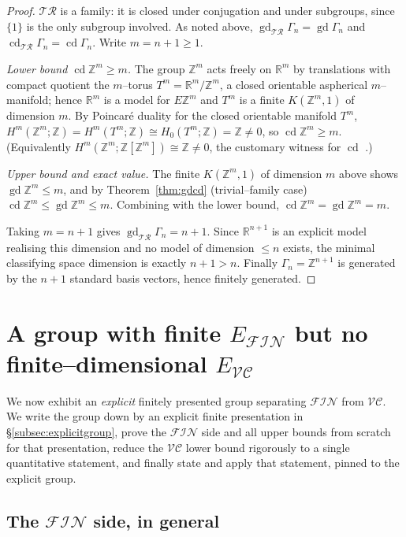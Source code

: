 \documentclass{amsart}
\theoremstyle{definition}
\newcommand{\Z}{\mathbb{Z}}
\newcommand{\R}{\mathbb{R}}
\newcommand{\FIN}{\mathcal{F\!I\!N}}
\newcommand{\VC}{\mathcal{V\!C}}
\newcommand{\gd}{\operatorname{gd}}
\newcommand{\cd}{\operatorname{cd}}
\begin{document}
\begin{proof}
$\mathcal{TR}$ is a family: it is closed under conjugation and under subgroups, since
$\{1\}$ is the only subgroup involved. As noted above,
$\gd_{\mathcal{TR}}\Gamma_n=\gd\Gamma_n$ and $\cd_{\mathcal{TR}}\Gamma_n=\cd\Gamma_n$. Write
$m=n+1\ge 1$.

\smallskip
\emph{Lower bound $\cd\Z^{m}\ge m$.} The group $\Z^{m}$ acts freely on $\R^{m}$ by
translations with compact quotient the $m$--torus $T^{m}=\R^{m}/\Z^{m}$, a closed orientable
aspherical $m$--manifold; hence $\R^{m}$ is a model for $E\Z^{m}$ and $T^{m}$ is a finite
$K(\Z^{m},1)$ of dimension $m$. By Poincaré duality for the closed orientable manifold
$T^{m}$, $H^{m}(\Z^{m};\Z)=H^{m}(T^{m};\Z)\cong H_{0}(T^{m};\Z)=\Z\ne 0$, so
$\cd\Z^{m}\ge m$. (Equivalently $H^{m}(\Z^{m};\Z[\Z^{m}])\cong\Z\ne0$, the customary
witness for $\cd$ \cite[\S VIII.2]{Brown}.)

\smallskip
\emph{Upper bound and exact value.} The finite $K(\Z^{m},1)$ of dimension $m$ above shows
$\gd\Z^{m}\le m$, and by Theorem~\ref{thm:gdcd} (trivial--family case)
$\cd\Z^{m}\le\gd\Z^{m}\le m$. Combining with the lower bound, $\cd\Z^{m}=\gd\Z^{m}=m$.

\smallskip
Taking $m=n+1$ gives $\gd_{\mathcal{TR}}\Gamma_n=n+1$. Since $\R^{n+1}$ is an explicit model
realising this dimension and no model of dimension $\le n$ exists, the minimal classifying
space dimension is exactly $n+1>n$. Finally $\Gamma_n=\Z^{n+1}$ is generated by the $n+1$
standard basis vectors, hence finitely generated.
\end{proof}

\section{A group with finite \texorpdfstring{$E_{\FIN}$}{E\_FIN} but no finite--dimensional
\texorpdfstring{$E_{\VC}$}{E\_VC}}

We now exhibit an \emph{explicit} finitely presented group separating $\FIN$ from $\VC$. We
write the group down by an explicit finite presentation in \S\ref{subsec:explicitgroup},
prove the $\FIN$ side and all upper bounds from scratch for that presentation, reduce the
$\VC$ lower bound rigorously to a single quantitative statement, and finally state and apply
that statement, pinned to the explicit group.

\subsection{The $\FIN$ side, in general}
\end{document}
